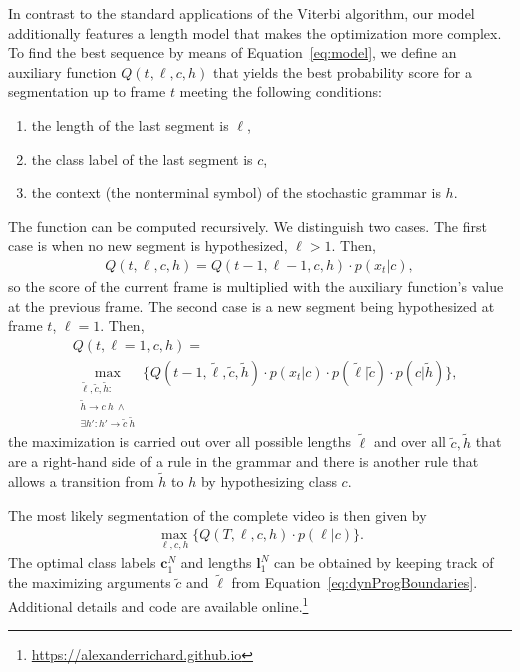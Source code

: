 \documentclass[10pt,twocolumn,letterpaper]{article}
\begin{document}
In contrast to the standard applications of the Viterbi algorithm, our model additionally
features a length model that makes the optimization more complex. To find the best
sequence by means of Equation~\eqref{eq:model}, we define an auxiliary function
$ Q(t,\ell,c,h) $ that yields the best probability score for a segmentation up to
frame $ t $ meeting the following conditions:
\begin{enumerate}
    \setlength{\itemsep}{0pt}
    \setlength{\parskip}{0pt}
    \item the length of the last segment is $ \ell $,
    \item the class label of the last segment is $ c $,
    \item the context (the nonterminal symbol) of the stochastic grammar is $ h $.
\end{enumerate}
The function can be computed recursively. We distinguish two cases. The first case
is when no new segment is hypothesized, \ie $ \ell > 1 $. Then,
\begin{align}
    Q(t,\ell,c,h) = Q(t-1,\ell-1,c,h) \cdot p(x_t|c),
\end{align}
so the score of the current frame is multiplied with the auxiliary function's value at the previous frame.
The second case is a new segment being hypothesized at frame $ t $, \ie $ \ell = 1 $. Then,
\begin{align}
    &Q(t,\ell=1,c,h) = \nonumber \\
    &\max_{\substack{ \tilde \ell, \tilde c, \tilde h: \\ \tilde h \rightarrow c~h ~\land \\ \exists h': h' \rightarrow \tilde c ~\tilde h }}
    \big\{ Q(t-1,\tilde \ell,\tilde c,\tilde h) \cdot p(x_t|c) \cdot p(\tilde \ell|\tilde c) \cdot p(c|\tilde h) \big\},
    \label{eq:dynProgBoundaries}
\end{align}
\ie the maximization is carried out over all possible lengths $ \tilde \ell $ and
over all $ \tilde c, \tilde h $ that are a right-hand side of a rule in the grammar
and there is another rule that allows a transition from $ \tilde h $ to $ h $ by
hypothesizing class $ c $.


The most likely segmentation of the complete video is then given by
\begin{align}
    \max_{\ell,c,h} \big\{ Q(T,\ell,c,h) \cdot p(\ell|c) \big\}.
\end{align}
The optimal class labels $ \mathbf{c}_1^N $ and lengths $ \mathbf{l}_1^N $ can be
obtained by keeping track of the maximizing arguments $ \tilde c $ and $ \tilde \ell $
from Equation~\eqref{eq:dynProgBoundaries}. Additional details and code are available online.\footnote{\url{https://alexanderrichard.github.io}}
\end{document}
